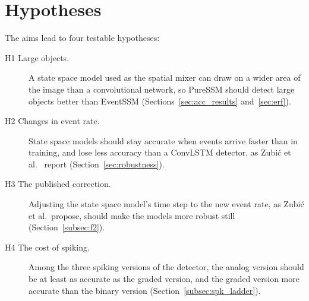 \documentclass[11pt, a4paper]{report}
\begin{document}
\section{Hypotheses}
\label{sec:hypotheses}
The aims lead to four testable hypotheses:
\begin{description}
  \item[H1 Large objects.] A state space model used as the spatial mixer can draw on a wider area
            of the image than a convolutional network, so PureSSM should detect large objects better than
            EventSSM (Sections~\ref{sec:acc_results} and~\ref{sec:erf}).
  \item[H2 Changes in event rate.] State space models should stay accurate when events arrive
            faster than in training, and lose less accuracy than a ConvLSTM detector, as
            Zubi\'{c} et al.~\cite{zubic2024state} report (Section~\ref{sec:robustness}).
  \item[H3 The published correction.] Adjusting the state space model's time step to the new event
            rate, as Zubi\'{c} et al.\ propose, should make the models more robust still
            (Section~\ref{subsec:f2}).
  \item[H4 The cost of spiking.] Among the three spiking versions of the detector, the analog
            version should be at least as accurate as the graded version, and the graded version more
            accurate than the binary version (Section~\ref{subsec:spk_ladder}). 
\end{description}
\end{document}
